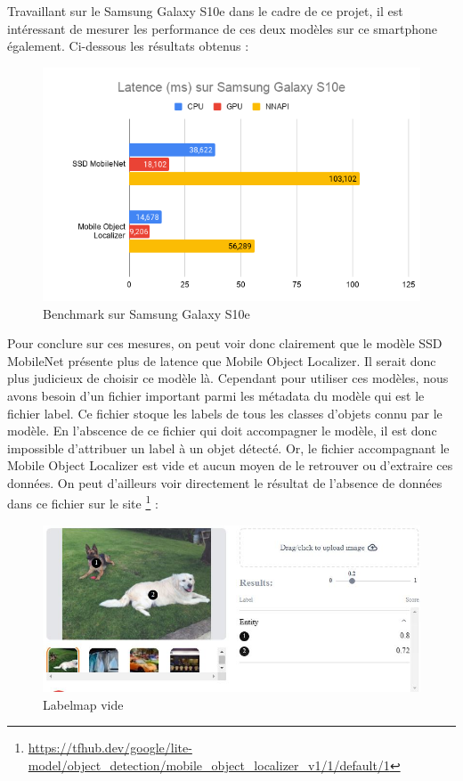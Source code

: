 \documentclass[UTF8]{EPURapport}
\begin{document}
Travaillant sur le Samsung Galaxy S10e dans le cadre de ce projet, il est intéressant de mesurer les performance de ces deux modèles sur ce smartphone également. Ci-dessous les résultats obtenus :

\begin{figure}[h!]
\centering
  \includegraphics[width=\textwidth]{images/bench_s10e.png}
  \caption{Benchmark sur Samsung Galaxy S10e}
  \label{fig:benchs10e}
\end{figure}

Pour conclure sur ces mesures, on peut voir donc clairement que le modèle SSD MobileNet présente plus de latence que Mobile Object Localizer. Il serait donc plus judicieux de choisir ce modèle là. Cependant pour utiliser ces modèles, nous avons besoin d'un fichier important parmi les métadata du modèle qui est le fichier label. Ce fichier stoque les labels de tous les classes d'objets connu par le modèle. En l'abscence de ce fichier qui doit accompagner le modèle, il est donc impossible d'attribuer un label à un objet détecté. Or, le fichier accompagnant le Mobile Object Localizer est vide et aucun moyen de le retrouver ou d'extraire ces données.  On peut d'ailleurs voir directement le résultat de l'absence de données dans ce fichier sur le site \footnote{\url{https://tfhub.dev/google/lite-model/object_detection/mobile_object_localizer_v1/1/default/1}} :

\begin{figure}[h!]
\centering
  \includegraphics[width=\textwidth]{images/labels_empty.JPG}
  \caption{Labelmap vide}
  \label{fig:labelsempty}
\end{figure}
\end{document}
